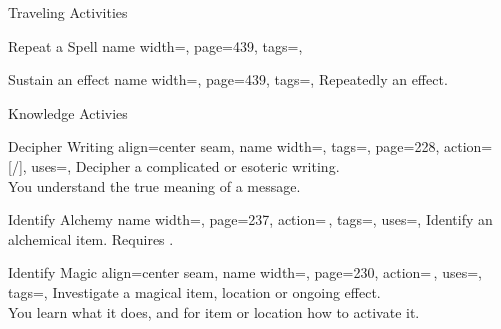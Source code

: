 \begin{PageFront}
\begin{Tables}{\frontTableHeight}
\begin{Table}{Traveling Activities}
\begin{entry}{Repeat a Spell}{%
                name width=\activityLength,%
                page=439,
                tags=\Concentrate,
            }
            \end{entry}
            \begin{entry}{Sustain an effect}{%
                name width=\activityLength,%
                page=439,
                tags=\Concentrate,
            }
                Repeatedly  an effect. \hfill
            \end{entry}
        \end{Table}
        \TableSpace
        \begin{Table}{Knowledge Activies}
            \begin{entry}{Decipher Writing}{%
                align=center seam,
                name width=\activityLength,%
                tags=\Concentrate,
                page=228,
                action=\,[/],
                uses={\VariousKnowledge[tags={T,S}]},
            }
                Decipher a complicated or esoteric writing. \hfill
                \\
                You understand the true meaning of a   message. \hfill
            \end{entry}
            \begin{entry}{Identify Alchemy}{%
                name width=\activityLength,%
                page=237,
                action=\,,
                tags=\Concentrate,
                uses={\Crafting[tags={T,S}]},
            }
                Identify an alchemical item. Requires .\hfill
            \end{entry}
            \begin{entry}{Identify Magic}{%
                align=center seam,
                name width=\activityLength,%
                page=230,
                action=\,,
                uses={\MagicalSkill[tags={T,S}]},
                tags=\Concentrate,
            }
                Investigate a magical item, location or ongoing effect.\hfill
                \quad
                \\
                You learn what it does, and for item or location how to activate it. \hfill

\end{entry}
\end{Table}
\end{Tables}
\end{PageFront}
